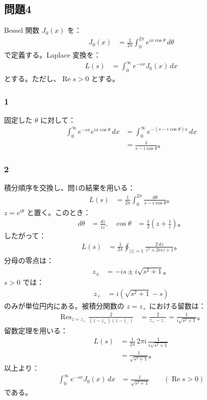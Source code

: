\documentclass[platex,dvipdfmx,a4paper]{jsarticle}
\begin{document}
\subsection*{問題4}

Bessel 関数 $J_0(x)$ を：
\begin{align*}
  J_0(x)
  &=\frac{1}{2\pi}\int_0^{2\pi}e^{ix\cos\theta}\,d\theta
\end{align*}
で定義する。Laplace 変換を：
\begin{align*}
  L(s)
  &=\int_0^\infty e^{-sx}J_0(x)\,dx
\end{align*}
とする。ただし、$\operatorname{Re}s>0$ とする。

\subsubsection*{1}

固定した $\theta$ に対して：
\begin{align*}
  \int_0^\infty e^{-sx}e^{ix\cos\theta}\,dx
  &=\int_0^\infty e^{-(s-i\cos\theta)x}\,dx \\
  &=\frac{1}{s-i\cos\theta}。
\end{align*}

\subsubsection*{2}

積分順序を交換し、問1の結果を用いる：
\begin{align*}
  L(s)
  &=\frac{1}{2\pi}\int_0^{2\pi}\frac{d\theta}{s-i\cos\theta}。
\end{align*}
$z=e^{i\theta}$ と置く。このとき：
\begin{align*}
  d\theta&=\frac{dz}{iz},
  &\cos\theta&=\frac{1}{2}\left(z+\frac{1}{z}\right)。
\end{align*}
したがって：
\begin{align*}
  L(s)
  &=\frac{1}{2\pi}\oint_{|z|=1}\frac{2\,dz}{z^2+2isz+1}。
\end{align*}
分母の零点は：
\begin{align*}
  z_\pm
  &=-is\pm i\sqrt{s^2+1}。
\end{align*}
$s>0$ では：
\begin{align*}
  z_+
  &=i\left(\sqrt{s^2+1}-s\right)
\end{align*}
のみが単位円内にある。被積分関数の $z=z_+$ における留数は：
\begin{align*}
  \mathop{\mathrm{Res}}_{z=z_+}\frac{2}{(z-z_+)(z-z_-)}
  &=\frac{2}{z_+-z_-}
   =\frac{1}{i\sqrt{s^2+1}}。
\end{align*}
留数定理を用いる：
\begin{align*}
  L(s)
  &=\frac{1}{2\pi}\,2\pi i\,
    \frac{1}{i\sqrt{s^2+1}} \\
  &=\frac{1}{\sqrt{s^2+1}}。
\end{align*}
以上より：
\begin{align*}
  \int_0^\infty e^{-sx}J_0(x)\,dx
  &=\frac{1}{\sqrt{s^2+1}}
  \qquad (\operatorname{Re}s>0)
\end{align*}
である。
\end{document}
